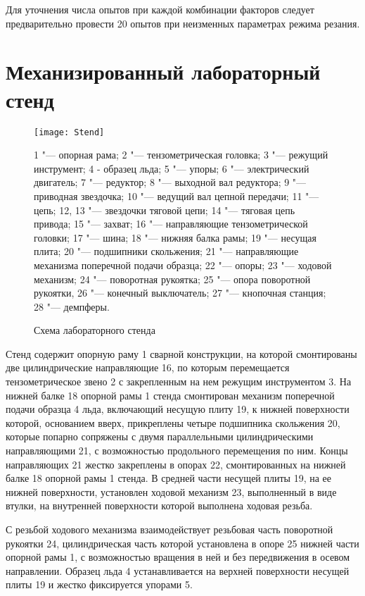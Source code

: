 Для уточнения числа опытов при каждой комбинации факторов следует предварительно провести 20 опытов при неизменных параметрах режима резания.

\section{Механизированный лабораторный стенд}\label{sect2_3}

\begin{figure} [htbp]
	\center
	\texttt{[image: Stend]}
	
	1 "--- опорная рама; 2 "--- тензометрическая головка; 3 "--- режущий инструмент; 4 - образец льда; 5 "--- упоры; 6 "--- электрический двигатель; 7 "--- редуктор; 8 "--- выходной вал редуктора; 9 "--- приводная звездочка; 10 "--- ведущий вал цепной передачи; 11 "--- цепь; 12, 13 "--- звездочки тяговой цепи; 14 "--- тяговая цепь привода; 15 "--- захват; 16 "--- направляющие тензометрической головки; 17 "--- шина; 18 "--- нижняя балка рамы; 19 "--- несущая плита; 20 "--- подшипники скольжения; 21 "--- направляющие механизма поперечной подачи образца; 22 "--- опоры; 23 "--- ходовой механизм; 24 "--- поворотная рукоятка; 25 "--- опора поворотной рукоятки, 26 "--- конечный выключатель; 27 "--- кнопочная станция; 28 "--- демпферы.
	\caption{Схема лабораторного стенда} 
	\label{img:Stend}  
\end{figure}

Стенд содержит опорную раму 1 сварной конструкции, на которой смонтированы две цилиндрические направляющие 16, по которым перемещается тензометрическое звено 2 с закрепленным на нем режущим инструментом 3. На нижней балке 18 опорной рамы 1 стенда смонтирован механизм поперечной подачи образца 4 льда, включающий несущую плиту 19, к нижней поверхности которой, основанием вверх, прикреплены четыре подшипника скольжения 20, которые попарно сопряжены с двумя параллельными цилиндрическими направляющими 21, с возможностью продольного перемещения по ним. Концы направляющих 21 жестко закреплены в опорах 22, смонтированных на нижней балке 18 опорной рамы 1 стенда. В средней части несущей плиты 19, на ее нижней поверхности, установлен ходовой механизм 23, выполненный в виде втулки, на внутренней поверхности которой выполнена ходовая резьба.
 
С резьбой ходового механизма взаимодействует резьбовая часть поворотной рукоятки 24, цилиндрическая часть которой установлена в опоре 25 нижней части опорной рамы 1, с возможностью вращения в ней и без передвижения в осевом направлении. Образец льда 4 устанавливается на верхней поверхности несущей плиты 19 и жестко фиксируется упорами 5.

